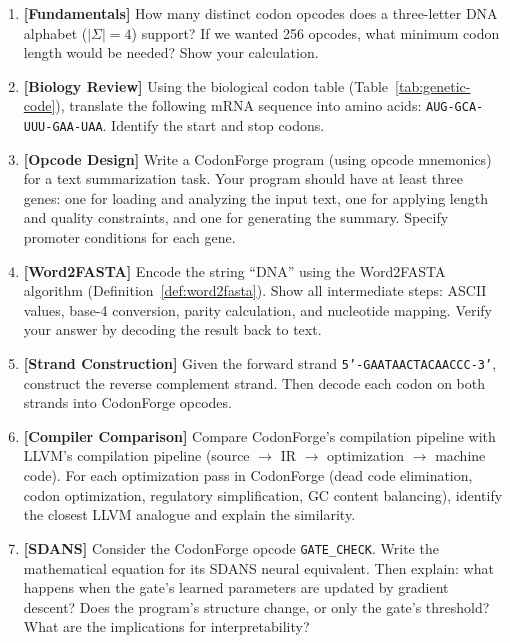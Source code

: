 \begin{enumerate}[label=\textbf{11.\arabic*.}, leftmargin=2.5em]

\item \textbf{[Fundamentals]} How many distinct codon opcodes does a three-letter DNA alphabet ($|\Sigma| = 4$) support? If we wanted 256 opcodes, what minimum codon length would be needed? Show your calculation.

\item \textbf{[Biology Review]} Using the biological codon table (Table~\ref{tab:genetic-code}), translate the following mRNA sequence into amino acids: \texttt{AUG-GCA-UUU-GAA-UAA}. Identify the start and stop codons.

\item \textbf{[Opcode Design]} Write a CodonForge program (using opcode mnemonics) for a text summarization task. Your program should have at least three genes: one for loading and analyzing the input text, one for applying length and quality constraints, and one for generating the summary. Specify promoter conditions for each gene.

\item \textbf{[Word2FASTA]} Encode the string ``DNA'' using the Word2FASTA algorithm (Definition~\ref{def:word2fasta}). Show all intermediate steps: ASCII values, base-4 conversion, parity calculation, and nucleotide mapping. Verify your answer by decoding the result back to text.

\item \textbf{[Strand Construction]} Given the forward strand \texttt{5'-GAA\;TAA\;CTA\;CAA\;CCC-3'}, construct the reverse complement strand. Then decode each codon on both strands into CodonForge opcodes.

\item \textbf{[Compiler Comparison]} Compare CodonForge's compilation pipeline with LLVM's compilation pipeline (source $\to$ IR $\to$ optimization $\to$ machine code). For each optimization pass in CodonForge (dead code elimination, codon optimization, regulatory simplification, GC content balancing), identify the closest LLVM analogue and explain the similarity.

\item \textbf{[SDANS]} Consider the CodonForge opcode \texttt{GATE\_CHECK}. Write the mathematical equation for its SDANS neural equivalent. Then explain: what happens when the gate's learned parameters are updated by gradient descent? Does the program's structure change, or only the gate's threshold? What are the implications for interpretability?


\end{enumerate}
